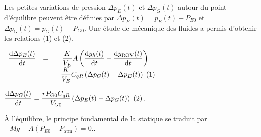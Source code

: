 \begin{multicols}{2}
Les petites variations de pression $\Delta p_E(t)$ et $\Delta p_G(t)$ autour du point d’équilibre peuvent être
définies par $\Delta p_E(t) = p_E(t) - P_{E0}$ et $\Delta p_G(t) = p_G(t) -P_{G0}$.
Une étude de mécanique des fluides a permis d’obtenir les relations (1) et (2).

$
\begin{array}{ccc}
\dfrac{\text d\Delta p_E(t)}{\text dt} &=& \dfrac{K}{V_E} A\left( \dfrac{\text d y_h(t)}{\text dt}-\dfrac{\text d y_{\text{ROV}}(t)}{\text dt}\right) \\ 
&& +\dfrac{K}{V_E} C_{qR}\left(\Delta p_G(t)-\Delta p_E(t)\right) \; (1)
\end{array}$

$\dfrac{\text d\Delta p_G(t)}{\text dt}=\dfrac{rP_{G0}C_{qR}}{V_{G0}}\left(\Delta p_E(t)-\Delta p_G(t)\right)  \; (2)$.


\fi

% 
% 
% 
% 
\ifprof
\else
À l'équilibre, le principe fondamental de la statique se traduit par $-Mg + A(P_{E0}-P_{\text{atm}})=0.$.

%
%  
%


\end{multicols}
